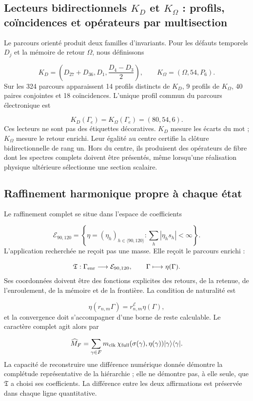 \subsection{Lecteurs bidirectionnels \(K_D\) et \(K_\Omega\) : profils, coïncidences et opérateurs par multisection}
Le parcours orienté produit deux familles d'invariants. Pour les défauts temporels \(D_j\) et la mémoire de retour \(\Omega\), nous définissons

\[
K_D=\left(D_{27}+D_{36},D_1,\frac{D_4-D_3}{2}\right),
\qquad
K_\Omega=(\Omega,54,P_6).
\]
Sur les 324 parcours apparaissent 14 profils distincts de \(K_D\), 9 profils de \(K_\Omega\), 40 paires conjointes et 18 coïncidences. L'unique profil commun du parcours électronique est

\[
K_D(\Gamma_e)=K_\Omega(\Gamma_e)=(80,54,6).
\]
Ces lecteurs ne sont pas des étiquettes décoratives. \(K_D\) mesure les écarts du mot ; \(K_\Omega\) mesure le retour enrichi. Leur égalité au centre certifie la clôture bidirectionnelle de rang un. Hors du centre, ils produisent des opérateurs de fibre dont les spectres complets doivent être présentés, même lorsqu'une réalisation physique ultérieure sélectionne une section scalaire.

\subsection{Raffinement harmonique propre à chaque état}
Le raffinement complet se situe dans l'espace de coefficients

\[
\mathcal E_{90,120}
=\left\{\eta=(\eta_h)_{h\in\langle90,120\rangle}:
\sum_h|\eta_hs_h|<\infty\right\}.
\]
L'application recherchée ne reçoit pas une masse. Elle reçoit le parcours enrichi :

\[
\mathfrak T:\Gamma_{\rm enr}\longrightarrow\mathcal E_{90,120},
\qquad
\Gamma\longmapsto\eta(\Gamma).
\]
Ses coordonnées doivent être des fonctions explicites des retours, de la retenue, de l'enroulement, de la mémoire et de la frontière. La condition de naturalité est

\[
\eta(r_{n,m}\Gamma)=r^{\mathcal E}_{n,m}\eta(\Gamma),
\]
et la convergence doit s'accompagner d'une borne de reste calculable. Le caractère complet agit alors par

\[
\widehat M_F
=\sum_{\gamma\in F}
m_{\rm clk}\,
\chi_{\rm full}(\sigma(\gamma),\eta(\gamma))
|\gamma\rangle\langle\gamma|.
\]
La capacité de reconstruire une différence numérique donnée démontre la complétude représentative de la hiérarchie ; elle ne démontre pas, à elle seule, que \(\mathfrak T\) a choisi ses coefficients. La différence entre les deux affirmations est préservée dans chaque ligne quantitative.

